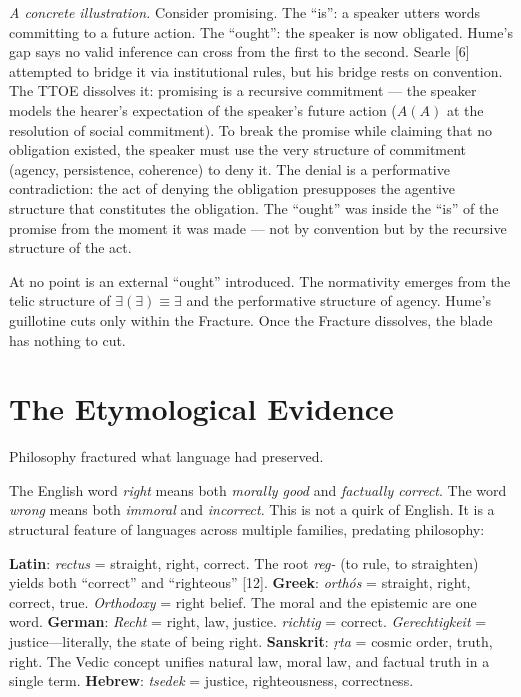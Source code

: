 \documentclass[12pt, letterpaper]{article}
\begin{document}
\noindent\textit{A concrete illustration.} Consider promising. The ``is'': a speaker utters words committing to a future action. The ``ought'': the speaker is now obligated. Hume's gap says no valid inference can cross from the first to the second. Searle [6] attempted to bridge it via institutional rules, but his bridge rests on convention. The TTOE dissolves it: promising is a recursive commitment --- the speaker models the hearer's expectation of the speaker's future action ($A(A)$ at the resolution of social commitment). To break the promise while claiming that no obligation existed, the speaker must use the very structure of commitment (agency, persistence, coherence) to deny it. The denial is a performative contradiction: the act of denying the obligation presupposes the agentive structure that constitutes the obligation. The ``ought'' was inside the ``is'' of the promise from the moment it was made --- not by convention but by the recursive structure of the act.

\vspace{1em}

At no point is an external ``ought'' introduced. The normativity emerges from the telic structure of $\exists(\exists) \equiv \exists$ and the performative structure of agency. Hume's guillotine cuts only within the Fracture. Once the Fracture dissolves, the blade has nothing to cut.

\section{The Etymological Evidence}

Philosophy fractured what language had preserved.

The English word \textit{right} means both \textit{morally good} and \textit{factually correct}. The word \textit{wrong} means both \textit{immoral} and \textit{incorrect}. This is not a quirk of English. It is a structural feature of languages across multiple families, predating philosophy:

\textbf{Latin}: \textit{rectus} = straight, right, correct. The root \textit{reg-} (to rule, to straighten) yields both ``correct'' and ``righteous'' [12]. \textbf{Greek}: \textit{orth\'{o}s} = straight, right, correct, true. \textit{Orthodoxy} = right belief. The moral and the epistemic are one word. \textbf{German}: \textit{Recht} = right, law, justice. \textit{richtig} = correct. \textit{Gerechtigkeit} = justice---literally, the state of being right. \textbf{Sanskrit}: \textit{\d{r}ta} = cosmic order, truth, right. The Vedic concept unifies natural law, moral law, and factual truth in a single term. \textbf{Hebrew}: \textit{tsedek} = justice, righteousness, correctness.
\end{document}
